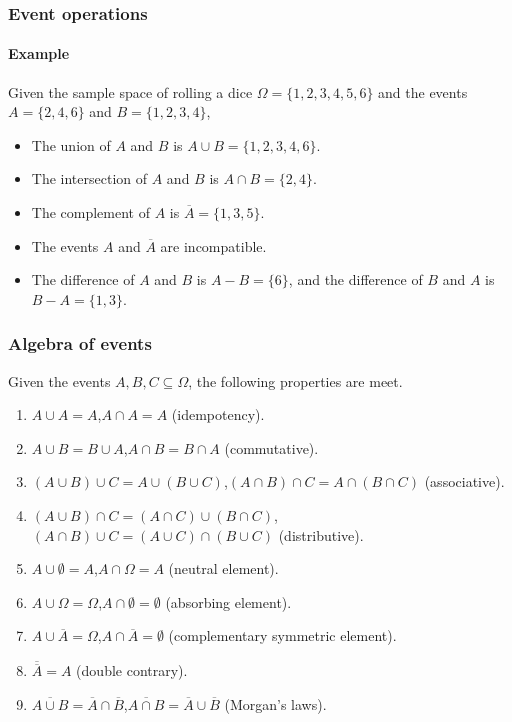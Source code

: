 \begin{frame}
\frametitle{Event operations}
\framesubtitle{Example}
Given the sample space of rolling a dice $\Omega=\{1,2,3,4,5,6\}$ and the events $A=\{2,4,6\}$ and $B=\{1,2,3,4\}$, 
\begin{itemize}
\item The union of $A$ and $B$ is $A\cup B=\{1,2,3,4,6\}$.
\item The intersection of $A$ and $B$ is $A\cap B=\{2,4\}$.
\item The complement of $A$ is $\overline A=\{1,3,5\}$.
\item The events $A$ and $\overline A$ are incompatible.
\item The difference of $A$ and $B$ is $A-B=\{6\}$, and the difference of $B$ and $A$ is $B-A=\{1,3\}$.
\end{itemize}
\end{frame}


\begin{frame}
\frametitle{Algebra of events}
Given the events $A,B,C\subseteq \Omega$, the following properties are meet. 
\begin{enumerate}[<+->]
\item $A\cup A=A$,\quad $A\cap A=A$ (idempotency).
\item $A\cup B=B\cup A$,\quad $A\cap B = B\cap A$ (commutative).
\item $(A\cup B)\cup C = A\cup (B\cup C)$,\quad $(A\cap B)\cap C = A\cap (B\cap C)$ (associative).
\item $(A\cup B)\cap C = (A\cap C)\cup (B\cap C)$,\quad $(A\cap B)\cup C = (A\cup C)\cap (B\cup C)$ (distributive).
\item $A\cup \emptyset=A$,\quad $A\cap \Omega=A$ (neutral element).
\item $A\cup \Omega=\Omega$,\quad $A\cap \emptyset=\emptyset$ (absorbing element).
\item $A\cup \overline A = \Omega$,\quad $A\cap \overline A= \emptyset$ (complementary symmetric element).
\item $\overline{\overline A} = A$ (double contrary).
\item $\overline{A\cup B} = \overline A\cap \overline B$,\quad $\overline{A\cap B} = \overline A\cup \overline B$ (Morgan's
laws).
\end{enumerate}
\end{frame}


